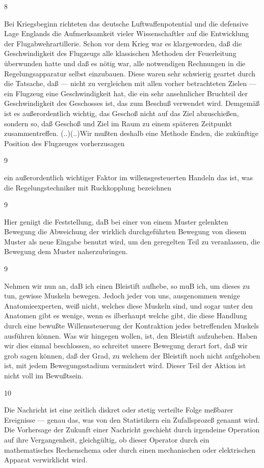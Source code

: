 \documentclass[
  letterpaper,
  DIV=11,
  numbers=noendperiod]{scrartcl}
\begin{document}
8

Bei Kriegsbeginn richteten das deutsche Luftwaffenpotential und die
defensive Lage Englands die Aufmerksamkeit vieler Wissenschaftler auf
die Entwicklung der Flugabwehrartillerie. Schon vor dem Krieg war es
klargeworden, daß die Geschwindigkeit des Flugzeugs alle klassischen
Methoden der Feuerleitung überwunden hatte und daß es nötig war, alle
notwendigen Rechnungen in die Regelungsapparatur selbst einzubauen.
Diese waren sehr schwierig geartet durch die Tatsache, daß --- nicht zu
vergleichen mit allen vorher betrachteten Zielen --- ein Flugzeug eine
Geschwindigkeit hat, die ein sehr ansehnlicher Bruchteil der
Geschwindigkeit des Geschosses ist, das zum Beschuß verwendet wird.
Demgemäß ist es außerordentlich wichtig, das Geschoß nicht auf das Ziel
abzuschießen, sondern so, daß Geschoß und Ziel im Raum zu einem späteren
Zeitpunkt zusammentreffen. (..)(..)Wir mußten deshalb eine Methode
Enden, die zukünftige Position des Flugzeuges vorherzusagen

9

ein außerordentlich wichtiger Faktor im willensgesteuerten Handeln das
ist, was die Regelungstechniker mit Ruckkopplung bezeichnen

9

Hier geniigt die Feststellung, daB bei einer von einem Muster gelenkten
Bewegung die Abweichung der wirklich durchgeführten Bewegung von diesem
Muster als neue Eingabe benutzt wird, um den geregelten Teil zu
veranlassen, die Bewegung dem Muster naherzubringen.

9

Nehmen wir nun an, daB ich einen Bleistift aufhebe, so muB ich, um
dieses zu tun, gewisse Muskeln bewegen. Jedoch jeder von uns,
ausgenommen wenige Anatomieexperten, weiß nicht, welches diese Muskeln
sind, und sogar unter den Anatomen gibt es wenige, wenn es ilberhaupt
welche gibt, die diese Handlung durch eine bewußte Willenssteuerung der
Kontraktion jedes betreffenden Muskels ausführen können. Was wir
hingegen wollen, ist, den Bleistift aufzuheben. Haben wir dies einmal
beschlossen, so schreitet unsere Bewegung derart fort, daß wir grob
sagen können, daß der Grad, zu welchem der Bleistift noch nicht
aufgehoben ist, mit jedem Bewegungsstadium vermindert wird. Dieser Teil
der Aktion ist nicht voll im Bewußtsein.

10

Die Nachricht ist eine zeitlich diskret oder stetig verteilte Folge
meßbarer Ereignisse --- genau das, was von den Statistikern ein
Zufallsprozeß genannt wird. Die Vorhersage der Zukunft einer Nachricht
geschieht durch irgendeine Operation auf ihre Vergangenheit,
gleichgültig, ob dieser Operator durch ein mathematisches Rechenschema
oder durch einen mechanischen oder elektrischen Apparat verwirklicht
wird.
\end{document}
